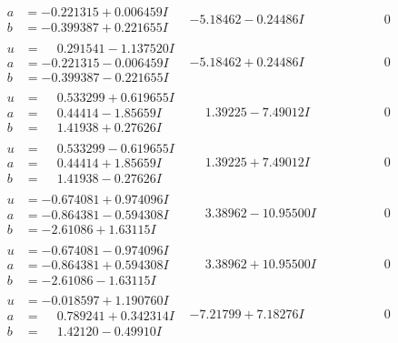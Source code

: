\documentclass[1p]{elsarticle_modified}
\theoremstyle{definition}
\begin{document}
$$\begin{array}{c|c|c}
\begin{aligned}
a &= -0.221315 + 0.006459 I \\
b &= -0.399387 + 0.221655 I\end{aligned}
 & -5.18462 - 0.24486 I & \phantom{-0.000000 } 0 \\ \hline\begin{aligned}
u &= \phantom{-}0.291541 - 1.137520 I \\
a &= -0.221315 - 0.006459 I \\
b &= -0.399387 - 0.221655 I\end{aligned}
 & -5.18462 + 0.24486 I & \phantom{-0.000000 } 0 \\ \hline\begin{aligned}
u &= \phantom{-}0.533299 + 0.619655 I \\
a &= \phantom{-}0.44414 - 1.85659 I \\
b &= \phantom{-}1.41938 + 0.27626 I\end{aligned}
 & \phantom{-}1.39225 - 7.49012 I & \phantom{-0.000000 } 0 \\ \hline\begin{aligned}
u &= \phantom{-}0.533299 - 0.619655 I \\
a &= \phantom{-}0.44414 + 1.85659 I \\
b &= \phantom{-}1.41938 - 0.27626 I\end{aligned}
 & \phantom{-}1.39225 + 7.49012 I & \phantom{-0.000000 } 0 \\ \hline\begin{aligned}
u &= -0.674081 + 0.974096 I \\
a &= -0.864381 - 0.594308 I \\
b &= -2.61086 + 1.63115 I\end{aligned}
 & \phantom{-}3.38962 - 10.95500 I & \phantom{-0.000000 } 0 \\ \hline\begin{aligned}
u &= -0.674081 - 0.974096 I \\
a &= -0.864381 + 0.594308 I \\
b &= -2.61086 - 1.63115 I\end{aligned}
 & \phantom{-}3.38962 + 10.95500 I & \phantom{-0.000000 } 0 \\ \hline\begin{aligned}
u &= -0.018597 + 1.190760 I \\
a &= \phantom{-}0.789241 + 0.342314 I \\
b &= \phantom{-}1.42120 - 0.49910 I\end{aligned}
 & -7.21799 + 7.18276 I & \phantom{-0.000000 } 0 \\ \hline\begin{aligned}

\end{aligned}
\end{array}$$
\end{document}

